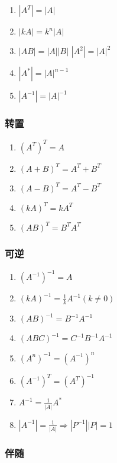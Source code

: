 \documentclass[a4paper,12pt]{article}
\begin{document}
    \begin{enumerate}
        \item $|A^T| = |A|$
        \item $|kA| = k^{n}|A|$
        \item $|AB| = |A||B|$ \;\text{,} $|A^2| = |A|^2$
        \item $|A^*| = |A|^{n-1}$
        \item $|A^{-1}| = |A|^{-1}$
    \end{enumerate}

    \subsubsection{转置}

    \begin{enumerate}
        \item $(A^T)^T = A$
        \item $(A + B)^T = A^T + B^T$
        \item $(A - B)^T = A^T - B^T$
        \item $(kA)^T = kA^T$
        \item $(AB)^T = B^{T}A^T $
    \end{enumerate}

    \subsubsection{可逆}

    \begin{enumerate}
        \item $(A^{-1})^{-1} = A$
        \item $(kA)^{-1} = \frac{1}{k}A^{-1}(k \neq 0)$
        \item $(AB)^{-1} = B^{-1}A^{-1}$
        \item $(ABC)^{-1} = C^{-1}B^{-1}A^{-1}$
        \item $(A^n)^{-1} = (A^{-1})^n$
        \item $(A^{-1})^T = (A^T)^{-1}$
        \item $A^{-1} = \frac{1}{|A|}A^{*}$
        \item $|A^{-1}| = \frac{1}{|A|} \Rightarrow |P^{-1}||P| = 1$
    \end{enumerate}

    \subsubsection{伴随}
\end{document}
